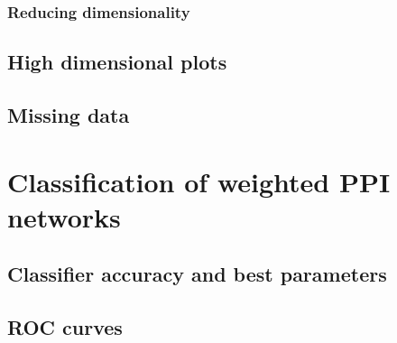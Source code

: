 \subsubsection{Reducing dimensionality}



\subsection{High dimensional plots}




\subsection{Missing data}


\section{Classification of weighted PPI networks}

\subsection{Classifier accuracy and best parameters}



\subsection{ROC curves}

